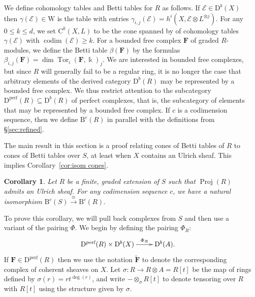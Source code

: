 \documentclass[12pt]{amsart}
\newtheorem{cor}[lemma]{Corollary}
\theoremstyle{definition}
\theoremstyle{remark}
\newcommand{\Proj}{\operatorname{Proj}}
\newcommand{\Tor}{\operatorname{Tor}}
\newcommand{\kk}{\Bbbk}
\newcommand{\codim}{\operatorname{codim}}
\newcommand{\WW}{\mathrm{W}}
\newcommand{\cc}{c}
\newcommand{\cE}{\mathcal{E}}
\newcommand{\FF}{\mathbf{F}}
\newcommand{\DD}{\mathrm{D}}
\newcommand{\CQ}{\mathrm{C}}
\newcommand{\BBQ}{\mathrm{B}}
\begin{document}
We define cohomology tables and Betti tables for $R$ as follows. If $\cE\in \DD^b(X)$ then $\gamma(\cE)\in \WW$ is the table with entries $\gamma_{i,j}(\cE)=h^i(X,\cE\otimes L^{\otimes j})$.  For any $0\leq k \leq d$, we set $\CQ^{k}(X,L)$ to be the cone spanned by of cohomology tables $\gamma(\cE)$ with $\codim(\cE)\geq k$.  For a bounded free complex $\FF$ of graded $R$-modules, we define the Betti table $\beta(\FF)$ by the formulas $\beta_{i,j}(\FF)=\dim \Tor_i(\FF,\kk)_j$.  
We are interested in bounded free complexes, but since $R$ will generally fail to be a regular ring, it is no longer the case that arbitrary elements of the derived category 
$\DD^b(R)$ may be represented by a bounded free complex.  
We thus restrict attention to the subcategory $\DD^{\text{perf}}(R)\subseteq \DD^b(R)$ of perfect complexes, that is, the subcategory of elements that may be
represented by a  bounded free complex.
If $\cc$ is a codimension sequence, then we define $\BBQ^{\cc}(R)$ in parallel with the definitions from \S\ref{sec:refined}.  

The main result in this section is a proof relating cones of Betti tables of $R$ to cones of Betti tables over $S$, at least when $X$ contains an Ulrich sheaf.  This implies Corollary~\ref{cor:isom cones}.

\begin{cor}\label{cor:new graded rings}
Let $R$ be a finite, graded extension of $S$ such that $\Proj(R)$ admits an Ulrich sheaf.  For any codimension sequence $\cc$, we have  a natural isomorphism
$
\BBQ^{\cc}(S)\overset{\cong}{\to} \BBQ^{\cc}(R).
$
\end{cor}

To prove this corollary, we will pull back complexes from $S$ and then use a variant of the pairing $\Phi$.  We begin by defining the pairing $\Phi_{R}$:
\[
\xymatrix{\DD^{\text{perf}}(R)\times \DD^{b}(X)  \ar[r]^-{\Phi_{R}}&\DD^{b}(A).}
\]
If $\FF \in \DD^{\text{perf}}(R)$ then we use the notation $\widetilde{\FF}$ to denote the corresponding complex of coherent sheaves on $X$.
Let $\sigma: R\to R\otimes A=R[t]$ be the map of rings defined by $\sigma(r)=rt^{\deg(r)}$, and
write $-\otimes_\sigma R[t]$ to denote tensoring over $R$ with $R[t]$ using the structure
given by $\sigma$. 
\end{document}
